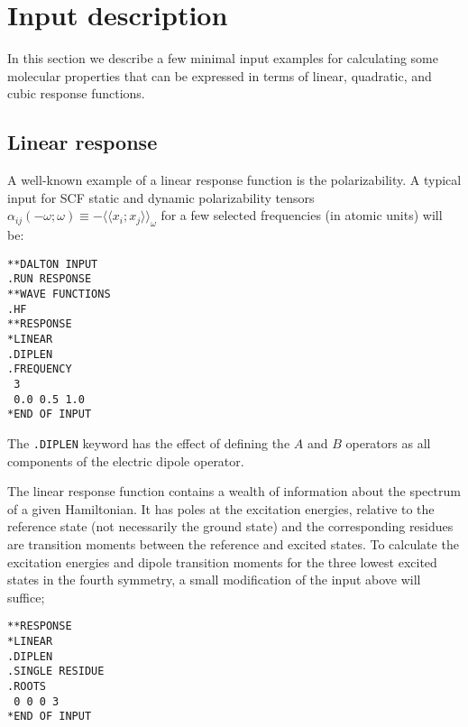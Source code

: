 \section{Input description}
\label{sec:rspex}
 
In this section we describe a few minimal input examples for calculating some
molecular properties that can be expressed in terms of linear, quadratic, and
cubic response functions.
 
\subsection{Linear response}
\label{subsec:linrsp}

\begin{center}
\end{center}

A well-known example of a linear response function is the polarizability. 
A typical input for SCF static and dynamic polarizability tensors
$\alpha_{ij}(-\omega;\omega)\equiv-\langle\!\langle
x_i;x_j\rangle\!\rangle_\omega$ for a few selected frequencies (in
atomic units) will be:
\begin{verbatim}
**DALTON INPUT
.RUN RESPONSE
**WAVE FUNCTIONS
.HF
**RESPONSE
*LINEAR
.DIPLEN
.FREQUENCY
 3
 0.0 0.5 1.0
*END OF INPUT
\end{verbatim}
The {\tt .DIPLEN} keyword has the effect of defining the $A$ and $B$
operators as all components of the electric dipole operator.

The linear response function contains a wealth of
information about the spectrum of a given Hamiltonian. 
It has poles at the excitation
energies, 
relative to the reference state (not necessarily the ground state) and the
corresponding residues are transition
moments between the reference and
excited states. To calculate the excitation energies and dipole transition 
moments for the three lowest excited states
in the fourth symmetry, a small 
modification of the input above will suffice;
\begin{verbatim}
**RESPONSE
*LINEAR
.DIPLEN
.SINGLE RESIDUE
.ROOTS
 0 0 0 3
*END OF INPUT
\end{verbatim}

